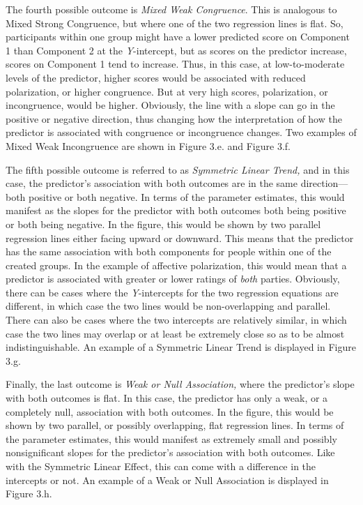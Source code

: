 \documentclass[authordate, meta]{jote-new-article}
\begin{document}
	The fourth possible outcome is \emph{Mixed Weak Congruence}. This is analogous to Mixed Strong Congruence, but where one of the two regression lines is flat. So, participants within one group might have a lower predicted score on Component 1 than Component 2 at the \emph{Y}-intercept, but as scores on the predictor increase, scores on Component 1 tend to increase. Thus, in this case, at low-to-moderate levels of the predictor, higher scores would be associated with reduced polarization, or higher congruence. But at very high scores, polarization, or incongruence, would be higher. Obviously, the line with a slope can go in the positive or negative direction, thus changing how the interpretation of how the predictor is associated with congruence or incongruence changes. Two examples of Mixed Weak Incongruence are shown in Figure 3.e. and Figure 3.f.



	The fifth possible outcome is referred to as \emph{Symmetric Linear Trend, }and in this case, the predictor's association with both outcomes are in the same direction—both positive or both negative. In terms of the parameter estimates, this would manifest as the slopes for the predictor with both outcomes both being positive or both being negative. In the figure, this would be shown by two parallel regression lines either facing upward or downward. This means that the predictor has the same association with both components for people within one of the created groups. In the example of affective polarization, this would mean that a predictor is associated with greater or lower ratings of \emph{both }parties. Obviously, there can be cases where the \emph{Y}-intercepts for the two regression equations are different, in which case the two lines would be non-overlapping and parallel. There can also be cases where the two intercepts are relatively similar, in which case the two lines may overlap or at least be extremely close so as to be almost indistinguishable. An example of a Symmetric Linear Trend is displayed in Figure 3.g.
	
	Finally, the last outcome is \emph{Weak or Null Association, }where the predictor's slope with both outcomes is flat. In this case, the predictor has only a weak, or a completely null, association with both outcomes. In the figure, this would be shown by two parallel, or possibly overlapping, flat regression lines. In terms of the parameter estimates, this would manifest as extremely small and possibly nonsignificant slopes for the predictor's association with both outcomes. Like with the Symmetric Linear Effect, this can come with a difference in the intercepts or not. An example of a Weak or Null Association is displayed in Figure 3.h.
\end{document}
